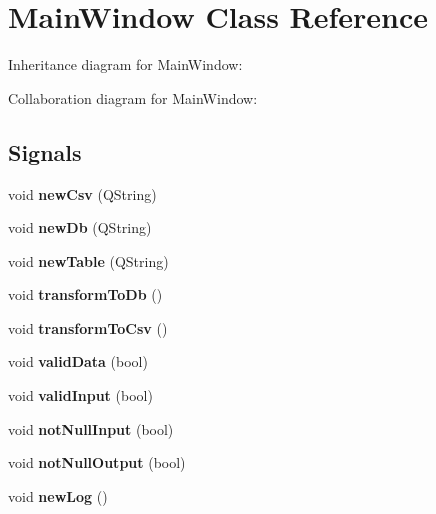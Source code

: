 \hypertarget{classMainWindow}{}\section{Main\+Window Class Reference}
\label{classMainWindow}


Inheritance diagram for Main\+Window\+:


Collaboration diagram for Main\+Window\+:
\subsection*{Signals}
\begin{DoxyCompactItemize}
\item 
void {\bfseries new\+Csv} (Q\+String)\hypertarget{classMainWindow_a823f31cb3270f356399925f6ee47cd89}{}\label{classMainWindow_a823f31cb3270f356399925f6ee47cd89}

\item 
void {\bfseries new\+Db} (Q\+String)\hypertarget{classMainWindow_a845f4e124f1ae1b66656e7aa198a992f}{}\label{classMainWindow_a845f4e124f1ae1b66656e7aa198a992f}

\item 
void {\bfseries new\+Table} (Q\+String)\hypertarget{classMainWindow_a6c723f132c2164cca8bf645caf5a3ac8}{}\label{classMainWindow_a6c723f132c2164cca8bf645caf5a3ac8}

\item 
void {\bfseries transform\+To\+Db} ()\hypertarget{classMainWindow_a3542656fa1260d0126771196850bc17f}{}\label{classMainWindow_a3542656fa1260d0126771196850bc17f}

\item 
void {\bfseries transform\+To\+Csv} ()\hypertarget{classMainWindow_aebb3ca9ec051976ac50b204713891a3e}{}\label{classMainWindow_aebb3ca9ec051976ac50b204713891a3e}

\item 
void {\bfseries valid\+Data} (bool)\hypertarget{classMainWindow_a2e41db7441bcafe45bdcd87d7587bdb6}{}\label{classMainWindow_a2e41db7441bcafe45bdcd87d7587bdb6}

\item 
void {\bfseries valid\+Input} (bool)\hypertarget{classMainWindow_a70f88f13a9bbf25ff16433288d0ce8ba}{}\label{classMainWindow_a70f88f13a9bbf25ff16433288d0ce8ba}

\item 
void {\bfseries not\+Null\+Input} (bool)\hypertarget{classMainWindow_ad79aea62d4d201444b9d484792d98805}{}\label{classMainWindow_ad79aea62d4d201444b9d484792d98805}

\item 
void {\bfseries not\+Null\+Output} (bool)\hypertarget{classMainWindow_a38e491b469e21b9d0dfd784d9ee952be}{}\label{classMainWindow_a38e491b469e21b9d0dfd784d9ee952be}

\item 
void {\bfseries new\+Log} ()\hypertarget{classMainWindow_a81dfc661231c2c2fa7625c8baf52c13a}{}\label{classMainWindow_a81dfc661231c2c2fa7625c8baf52c13a}

\end{DoxyCompactItemize}
